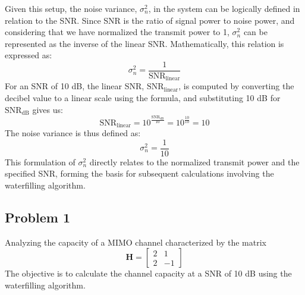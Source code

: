 \documentclass[lettersize,journal]{IEEEtran}
\begin{document}
Given this setup, the noise variance, \( \sigma^2_n \), in the system can be logically defined in relation to the SNR. Since SNR is the ratio of signal power to noise power, and considering that we have normalized the transmit power to 1, \( \sigma^2_n \) can be represented as the inverse of the linear SNR. Mathematically, this relation is expressed as:
\begin{equation}
\sigma^2_n = \frac{1}{\text{SNR}_{\text{linear}}}
\end{equation}
For an SNR of 10 dB, the linear SNR, \( \text{SNR}_{\text{linear}} \), is computed by converting the decibel value to a linear scale using the formula, and substituting 10 dB for \( \text{SNR}_{\text{dB}} \) gives us:
\begin{equation}
\text{SNR}_{\text{linear}} = 10^{\frac{\text{SNR}_{\text{dB}}}{10}} = 10^{\frac{10}{10}} = 10
\end{equation}
The noise variance is thus defined as:
\begin{equation}
\sigma^2_n = \frac{1}{10}
\end{equation}
This formulation of \( \sigma^2_n \) directly relates to the normalized transmit power and the specified SNR, forming the basis for subsequent calculations involving the waterfilling algorithm.

\subsection{Problem 1}
Analyzing the capacity of a MIMO channel characterized by the matrix
\begin{equation}
\mathbf{H} = \begin{bmatrix}
2 & 1 \\
2 & -1 \end{bmatrix}
\end{equation}
The objective is to calculate the channel capacity at a SNR of 10 dB using the waterfilling algorithm.
\end{document}
